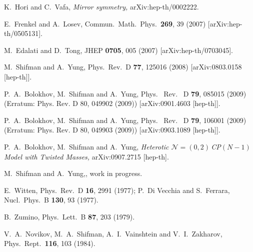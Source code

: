 \documentclass[epsfig,12pt]{article}
\newcommand{\nzt}{${\mathcal N}=(0,2)\,$}
\newcommand{\cpn}{CP$(N-1)\,$}
\begin{document}
{\begin{thebibliography}{99}
  K.~Hori and C.~Vafa,
{\em Mirror symmetry,}
  arXiv:hep-th/0002222.
  
E.~Frenkel and A.~Losev,
  Commun.\ Math.\ Phys.\  {\bf 269}, 39 (2007)
  [arXiv:hep-th/0505131].
  
 M.~Edalati and D.~Tong,
  JHEP {\bf 0705}, 005 (2007)
  [arXiv:hep-th/0703045].
  
  M.~Shifman and A.~Yung,
  Phys.\ Rev.\  D {\bf 77}, 125016 (2008)
  [arXiv:0803.0158 [hep-th]].
  
P.~A.~Bolokhov, M.~Shifman and A.~Yung,
  Phys. \ Rev. \ D {\bf 79}, 085015 (2009) (Erratum: Phys. Rev. D 80, 049902 (2009))
  [arXiv:0901.4603 [hep-th]].
  
  P.~A.~Bolokhov, M.~Shifman and A.~Yung,
  Phys. \ Rev. \ D {\bf 79}, 106001 (2009) (Erratum: Phys. Rev. D 80, 049903 (2009))
  [arXiv:0903.1089 [hep-th]].
  
  P.~A.~Bolokhov, M.~Shifman and A.~Yung,
{\em Heterotic \nzt \mbox{\cpn} Model with Twisted Masses,}
  arXiv:0907.2715 [hep-th].
  
   M.~Shifman and A.~Yung,, work in progress.
  
  E.~Witten,
  Phys.\ Rev.\  D {\bf 16}, 2991 (1977);
  P.~Di Vecchia and S.~Ferrara,
  Nucl.\ Phys.\  B {\bf 130}, 93 (1977).

 B.~Zumino,
  Phys.\ Lett.\  B {\bf 87}, 203 (1979).

 V.~A.~Novikov, M.~A.~Shifman, A.~I.~Vainshtein and V.~I.~Zakharov,
  Phys.\ Rept.\  {\bf 116}, 103 (1984).
   

\end{thebibliography}}
\end{document}
